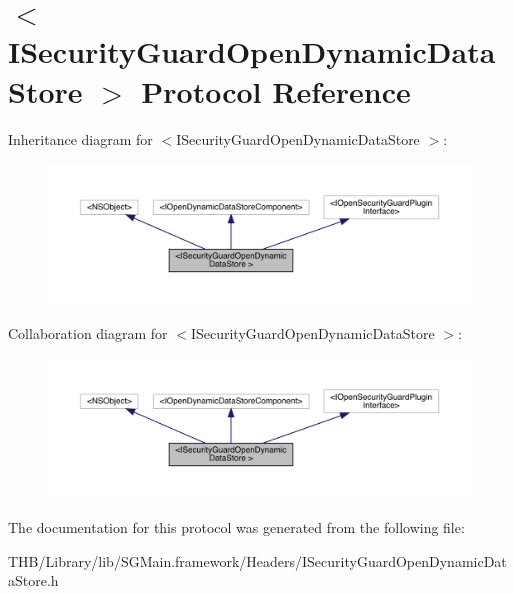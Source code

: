 \hypertarget{protocol_i_security_guard_open_dynamic_data_store_01-p}{}\section{$<$I\+Security\+Guard\+Open\+Dynamic\+Data\+Store $>$ Protocol Reference}
\label{protocol_i_security_guard_open_dynamic_data_store_01-p}


Inheritance diagram for $<$I\+Security\+Guard\+Open\+Dynamic\+Data\+Store $>$\+:\nopagebreak
\begin{figure}[H]
\begin{center}
\leavevmode
\includegraphics[width=350pt]{protocol_i_security_guard_open_dynamic_data_store_01-p__inherit__graph}
\end{center}
\end{figure}


Collaboration diagram for $<$I\+Security\+Guard\+Open\+Dynamic\+Data\+Store $>$\+:\nopagebreak
\begin{figure}[H]
\begin{center}
\leavevmode
\includegraphics[width=350pt]{protocol_i_security_guard_open_dynamic_data_store_01-p__coll__graph}
\end{center}
\end{figure}


The documentation for this protocol was generated from the following file\+:\begin{DoxyCompactItemize}
\item 
T\+H\+B/\+Library/lib/\+S\+G\+Main.\+framework/\+Headers/I\+Security\+Guard\+Open\+Dynamic\+Data\+Store.\+h\end{DoxyCompactItemize}

